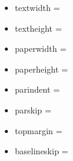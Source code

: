 \documentclass{basic}
\begin{document}

	\begin{itemize}
		\item textwidth    = \the\textwidth
		\item textheight   = \the\textheight
		\item paperwidth   = \the\paperwidth
		\item paperheight  = \the\paperheight
		\item parindent    = \the\parindent
		\item parskip      = \the\parskip
		\item topmargin    = \the\topmargin
		\item baselineskip = \the\baselineskip
	\end{itemize}
\end{document}

